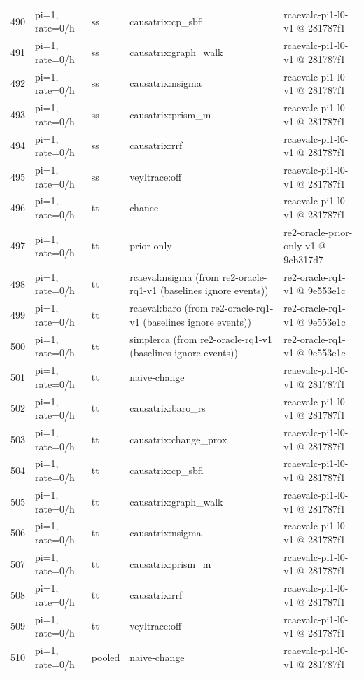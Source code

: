 \begin{longtable}{@{}r>{\raggedright\arraybackslash}p{48.0pt}>{\raggedright\arraybackslash}p{18.0pt}>{\raggedright\arraybackslash}p{108.0pt}>{\raggedright\arraybackslash}p{105.0pt}@{}}
490 & pi=1, rate=0/h & ss & causatrix:cp\_sbfl & rcaevalc-pi1-l0-v1 @ 281787f1 \\
491 & pi=1, rate=0/h & ss & causatrix:graph\_walk & rcaevalc-pi1-l0-v1 @ 281787f1 \\
492 & pi=1, rate=0/h & ss & causatrix:nsigma & rcaevalc-pi1-l0-v1 @ 281787f1 \\
493 & pi=1, rate=0/h & ss & causatrix:prism\_m & rcaevalc-pi1-l0-v1 @ 281787f1 \\
494 & pi=1, rate=0/h & ss & causatrix:rrf & rcaevalc-pi1-l0-v1 @ 281787f1 \\
495 & pi=1, rate=0/h & ss & veyltrace:off & rcaevalc-pi1-l0-v1 @ 281787f1 \\
496 & pi=1, rate=0/h & tt & chance & rcaevalc-pi1-l0-v1 @ 281787f1 \\
497 & pi=1, rate=0/h & tt & prior-only & re2-oracle-prior-only-v1 @ 9cb317d7 \\
498 & pi=1, rate=0/h & tt & rcaeval:nsigma (from re2-oracle-rq1-v1 (baselines ignore events)) & re2-oracle-rq1-v1 @ 9e553e1c \\
499 & pi=1, rate=0/h & tt & rcaeval:baro (from re2-oracle-rq1-v1 (baselines ignore events)) & re2-oracle-rq1-v1 @ 9e553e1c \\
500 & pi=1, rate=0/h & tt & simplerca (from re2-oracle-rq1-v1 (baselines ignore events)) & re2-oracle-rq1-v1 @ 9e553e1c \\
501 & pi=1, rate=0/h & tt & naive-change & rcaevalc-pi1-l0-v1 @ 281787f1 \\
502 & pi=1, rate=0/h & tt & causatrix:baro\_rs & rcaevalc-pi1-l0-v1 @ 281787f1 \\
503 & pi=1, rate=0/h & tt & causatrix:change\_prox & rcaevalc-pi1-l0-v1 @ 281787f1 \\
504 & pi=1, rate=0/h & tt & causatrix:cp\_sbfl & rcaevalc-pi1-l0-v1 @ 281787f1 \\
505 & pi=1, rate=0/h & tt & causatrix:graph\_walk & rcaevalc-pi1-l0-v1 @ 281787f1 \\
506 & pi=1, rate=0/h & tt & causatrix:nsigma & rcaevalc-pi1-l0-v1 @ 281787f1 \\
507 & pi=1, rate=0/h & tt & causatrix:prism\_m & rcaevalc-pi1-l0-v1 @ 281787f1 \\
508 & pi=1, rate=0/h & tt & causatrix:rrf & rcaevalc-pi1-l0-v1 @ 281787f1 \\
509 & pi=1, rate=0/h & tt & veyltrace:off & rcaevalc-pi1-l0-v1 @ 281787f1 \\
510 & pi=1, rate=0/h & pooled & naive-change & rcaevalc-pi1-l0-v1 @ 281787f1 \\

\end{longtable}

